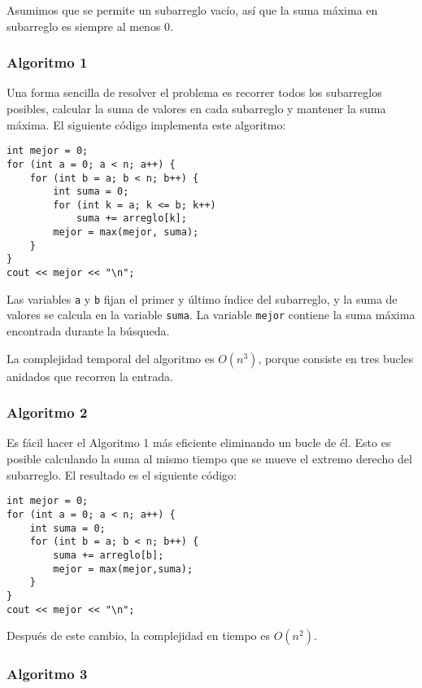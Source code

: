Asumimos que se permite un subarreglo vacío,
así que la suma máxima en subarreglo es siempre al menos $0$.

\subsubsection{Algoritmo 1}

Una forma sencilla de resolver el problema
es recorrer todos los subarreglos posibles,
calcular la suma de valores en cada subarreglo y mantener
la suma máxima.
El siguiente código implementa este algoritmo:

\begin{lstlisting}
int mejor = 0;
for (int a = 0; a < n; a++) {
    for (int b = a; b < n; b++) {
        int suma = 0;
        for (int k = a; k <= b; k++)
            suma += arreglo[k];
        mejor = max(mejor, suma);
    }
}
cout << mejor << "\n";
\end{lstlisting}

Las variables \texttt{a} y \texttt{b} fijan el primer y
último índice del subarreglo,
y la suma de valores se calcula en la variable \texttt{suma}.
La variable \texttt{mejor} contiene la suma máxima encontrada durante la búsqueda.

La complejidad temporal del algoritmo es $O(n^3)$,
porque consiste en tres bucles anidados
que recorren la entrada.

\subsubsection{Algoritmo 2}

Es fácil hacer el Algoritmo 1 más eficiente
eliminando un bucle de él.
Esto es posible calculando la suma al mismo
tiempo que se mueve el extremo derecho del subarreglo.
El resultado es el siguiente código:

\begin{lstlisting}
int mejor = 0;
for (int a = 0; a < n; a++) {
    int suma = 0;
    for (int b = a; b < n; b++) {
        suma += arreglo[b];
        mejor = max(mejor,suma);
    }
}
cout << mejor << "\n";
\end{lstlisting}
Después de este cambio, la complejidad en tiempo es $O(n^2)$.

\subsubsection{Algoritmo 3}


